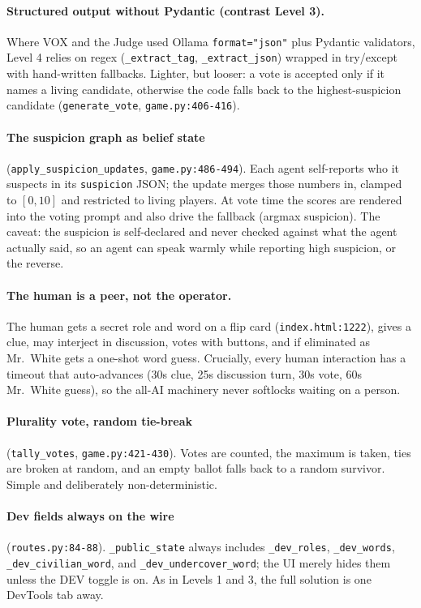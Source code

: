 \documentclass[11pt,a4paper]{article}
\begin{document}
\paragraph{Structured output without Pydantic (contrast Level 3).} Where VOX and
the Judge used Ollama \texttt{format="json"} plus Pydantic validators, Level 4
relies on regex (\texttt{\_extract\_tag}, \texttt{\_extract\_json}) wrapped in
try/except with hand-written fallbacks. Lighter, but looser: a vote is accepted
only if it names a living candidate, otherwise the code falls back to the
highest-suspicion candidate (\texttt{generate\_vote}, \texttt{game.py:406-416}).

\paragraph{The suspicion graph as belief state} (\texttt{apply\_suspicion\_updates},
\texttt{game.py:486-494}). Each agent self-reports who it suspects in its
\texttt{suspicion} JSON; the update merges those numbers in, clamped to
$[0,10]$ and restricted to living players. At vote time the scores are rendered
into the voting prompt and also drive the fallback (argmax suspicion). The caveat:
the suspicion is self-declared and never checked against what the agent actually
said, so an agent can speak warmly while reporting high suspicion, or the reverse.

\paragraph{The human is a peer, not the operator.} The human gets a secret role
and word on a flip card (\texttt{index.html:1222}), gives a clue, may interject in
discussion, votes with buttons, and if eliminated as Mr.\ White gets a one-shot
word guess. Crucially, every human interaction has a timeout that auto-advances
(30s clue, 25s discussion turn, 30s vote, 60s Mr.\ White guess), so the all-AI
machinery never softlocks waiting on a person.

\paragraph{Plurality vote, random tie-break} (\texttt{tally\_votes},
\texttt{game.py:421-430}). Votes are counted, the maximum is taken, ties are
broken at random, and an empty ballot falls back to a random survivor. Simple and
deliberately non-deterministic.

\paragraph{Dev fields always on the wire} (\texttt{routes.py:84-88}).
\texttt{\_public\_state} always includes \texttt{\_dev\_roles},
\texttt{\_dev\_words}, \texttt{\_dev\_civilian\_word}, and
\texttt{\_dev\_undercover\_word}; the UI merely hides them unless the DEV toggle is
on. As in Levels 1 and 3, the full solution is one DevTools tab away.
\end{document}
